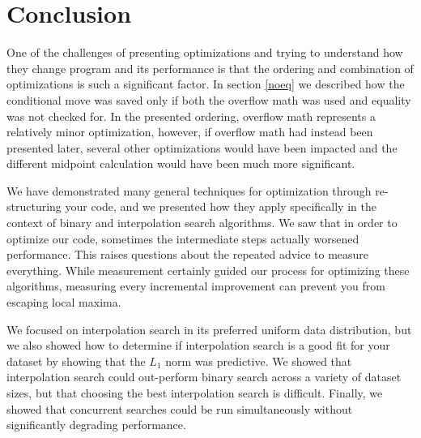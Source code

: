\documentclass[twocolumn]{article}
\begin{document}
\begin{figure}[t]
\end{figure}

\section{Conclusion}
One of the challenges of presenting optimizations and trying to understand how they change program and its performance is that the ordering and combination of optimizations is such a significant factor. In section \ref{noeq} we described how the conditional move was saved only if both the overflow math was used and equality was not checked for. In the presented ordering, overflow math represents a relatively minor optimization, however, if overflow math had instead been presented later, several other optimizations would have been impacted and the different midpoint calculation would have been much more significant.

We have demonstrated many general techniques for optimization through re-structuring your code, and we presented how they apply specifically in the context of binary and interpolation search algorithms. We saw that in order to optimize our code, sometimes the intermediate steps actually worsened performance. This raises questions about the repeated advice to measure everything. While measurement certainly guided our process for optimizing these algorithms, measuring every incremental improvement can prevent you from escaping local maxima.

We focused on interpolation search in its preferred uniform data distribution, but we also showed how to determine if interpolation search is a good fit for your dataset by showing that the $L_1$ norm was predictive. We showed that interpolation search could out-perform binary search across a variety of dataset sizes, but that choosing the best interpolation search is difficult. Finally, we showed that concurrent searches could be run simultaneously without significantly degrading performance.
\end{document}
